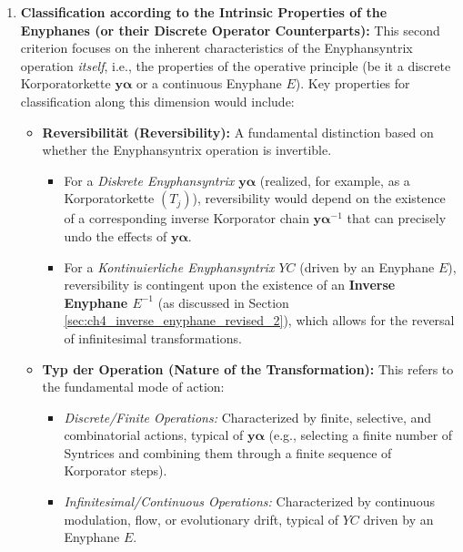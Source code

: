 \documentclass[
    12pt,              %
    a4paper,           %
    headings=normal,   %
    twoside=true,      %
    BCOR=8mm,          %
]{scrbook}
\newcommand{\diskreteEnyphansyntrix}{\bm{y\alpha}}
\newcommand{\kontinuierlicheEnyphansyntrix}{YC}
\newcommand{\enyphane}{E}
\begin{document}
\begin{enumerate}[label=(\arabic*)]
    \item  \textbf{Classification according to the Intrinsic Properties of the Enyphanes (or their Discrete Operator Counterparts):}
        This second criterion focuses on the inherent characteristics of the Enyphansyntrix operation \textit{itself}, i.e., the properties of the operative principle (be it a discrete Korporatorkette \(\diskreteEnyphansyntrix\) or a continuous Enyphane \(\enyphane\)). Key properties for classification along this dimension would include:
        \begin{itemize}
            \item   \textbf{Reversibilität (Reversibility):} A fundamental distinction based on whether the Enyphansyntrix operation is invertible.
                \begin{itemize}
                    \item   For a \textit{Diskrete Enyphansyntrix \(\diskreteEnyphansyntrix\)} (realized, for example, as a Korporatorkette \((T_j)\)), reversibility would depend on the existence of a corresponding inverse Korporator chain \(\diskreteEnyphansyntrix^{-1}\) that can precisely undo the effects of \(\diskreteEnyphansyntrix\).
                    \item   For a \textit{Kontinuierliche Enyphansyntrix \(\kontinuierlicheEnyphansyntrix\)} (driven by an Enyphane \(\enyphane\)), reversibility is contingent upon the existence of an \textbf{Inverse Enyphane \(\enyphane^{-1}\)} (as discussed in Section \ref{sec:ch4_inverse_enyphane_revised_2}), which allows for the reversal of infinitesimal transformations.
                \end{itemize}
            \item   \textbf{Typ der Operation (Nature of the Transformation):} This refers to the fundamental mode of action:
                \begin{itemize}
                    \item   \textit{Discrete/Finite Operations:} Characterized by finite, selective, and combinatorial actions, typical of \(\diskreteEnyphansyntrix\) (e.g., selecting a finite number of Syntrices and combining them through a finite sequence of Korporator steps).
                    \item   \textit{Infinitesimal/Continuous Operations:} Characterized by continuous modulation, flow, or evolutionary drift, typical of \(\kontinuierlicheEnyphansyntrix\) driven by an Enyphane \(\enyphane\).
                \end{itemize}

\end{itemize}
\end{enumerate}
\end{document}
